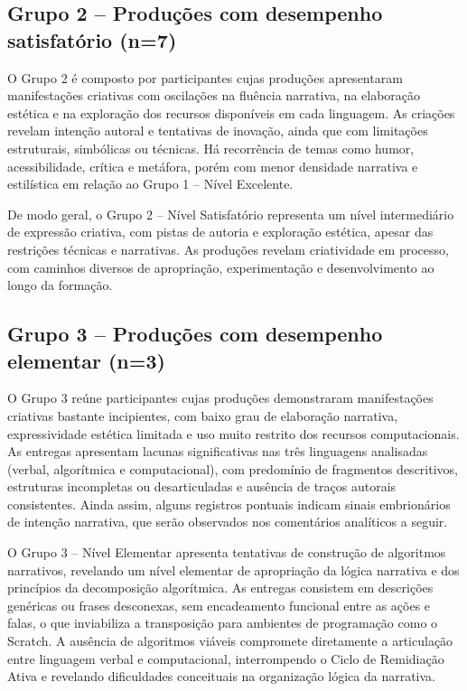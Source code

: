 \documentclass[portuguese]{textolivre}
\begin{document}
\subsection{Grupo 2 – Produções com desempenho satisfatório (n=7)}

O Grupo 2 é composto por participantes cujas produções apresentaram manifestações criativas com oscilações na fluência narrativa, na elaboração estética e na exploração dos recursos disponíveis em cada linguagem. As criações revelam intenção autoral e tentativas de inovação, ainda que com limitações estruturais, simbólicas ou técnicas. Há recorrência de temas como humor, acessibilidade, crítica e metáfora, porém com menor densidade narrativa e estilística em relação ao Grupo 1 – Nível Excelente. 

De modo geral, o Grupo 2 – Nível Satisfatório representa um nível intermediário de expressão criativa, com pistas de autoria e exploração estética, apesar das restrições técnicas e narrativas. As produções revelam criatividade em processo, com caminhos diversos de apropriação, experimentação e desenvolvimento ao longo da formação.

\subsection{Grupo 3 – Produções com desempenho elementar (n=3)}

O Grupo 3 reúne participantes cujas produções demonstraram manifestações criativas bastante incipientes, com baixo grau de elaboração narrativa, expressividade estética limitada e uso muito restrito dos recursos computacionais. As entregas apresentam lacunas significativas nas três linguagens analisadas (verbal, algorítmica e computacional), com predomínio de fragmentos descritivos, estruturas incompletas ou desarticuladas e ausência de traços autorais consistentes. Ainda assim, alguns registros pontuais indicam sinais embrionários de intenção narrativa, que serão observados nos comentários analíticos a seguir.

O Grupo 3 – Nível Elementar apresenta tentativas de construção de algoritmos narrativos, revelando um nível elementar de apropriação da lógica narrativa e dos princípios da decomposição algorítmica. As entregas consistem em descrições genéricas ou frases desconexas, sem encadeamento funcional entre as ações e falas, o que inviabiliza a transposição para ambientes de programação como o Scratch. A ausência de algoritmos viáveis compromete diretamente a articulação entre linguagem verbal e computacional, interrompendo o Ciclo de Remidiação Ativa e revelando dificuldades conceituais na organização lógica da narrativa.
\end{document}
